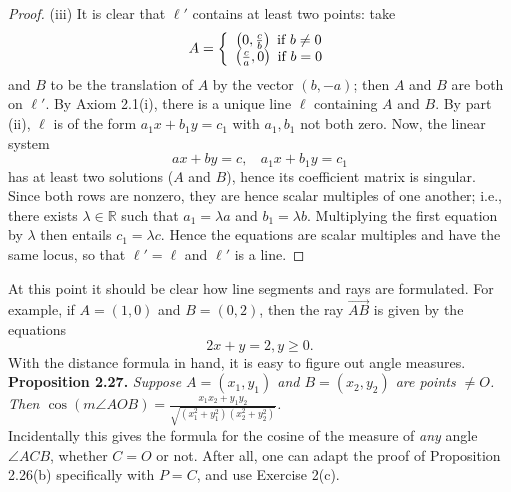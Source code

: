\documentclass[leqno]{book}
\begin{document}
\begin{proof}
(iii) It is clear that $\ell'$ contains at least two points: take
$$A=\left\{\begin{array}{c l}\left(0,\frac cb\right)\text{ if }b\ne 0\\\left(\frac ca,0\right)\text{ if }b=0\end{array}\right.$$
and $B$ to be the translation of $A$ by the vector $(b,-a)$; then $A$ and $B$ are both on $\ell'$.  By Axiom 2.1(i), there is a unique line $\ell$ containing $A$ and $B$.  By part (ii), $\ell$ is of the form $a_1x+b_1y=c_1$ with $a_1,b_1$ not both zero.  Now, the linear system
$$ax+by=c,~~~~a_1x+b_1y=c_1$$
has at least two solutions ($A$ and $B$), hence its coefficient matrix is singular.  Since both rows are nonzero, they are hence scalar multiples of one another; i.e., there exists $\lambda\in\mathbb R$ such that $a_1=\lambda a$ and $b_1=\lambda b$.  Multiplying the first equation by $\lambda$ then entails $c_1=\lambda c$.  Hence the equations are scalar multiples and have the same locus, so that $\ell'=\ell$ and $\ell'$ is a line.
\end{proof}

\noindent At this point it should be clear how line segments and rays are formulated.  For example, if $A=(1,0)$ and $B=(0,2)$, then the ray $\overset{\longrightarrow}{AB}$ is given by the equations
$$2x+y=2,y\geqslant 0.$$
With the distance formula in hand, it is easy to figure out angle measures.\\

\noindent\textbf{Proposition 2.27.} \emph{Suppose $A=(x_1,y_1)$ and $B=(x_2,y_2)$ are points $\ne O$.  Then $\cos(m\angle AOB)=\frac{x_1x_2+y_1y_2}{\sqrt{(x_1^2+y_1^2)(x_2^2+y_2^2)}}$.}\\

\noindent Incidentally this gives the formula for the cosine of the measure of \emph{any} angle $\angle ACB$, whether $C=O$ or not.  After all, one can adapt the proof of Proposition 2.26(b) specifically with $P=C$, and use Exercise 2(c).
\end{document}
